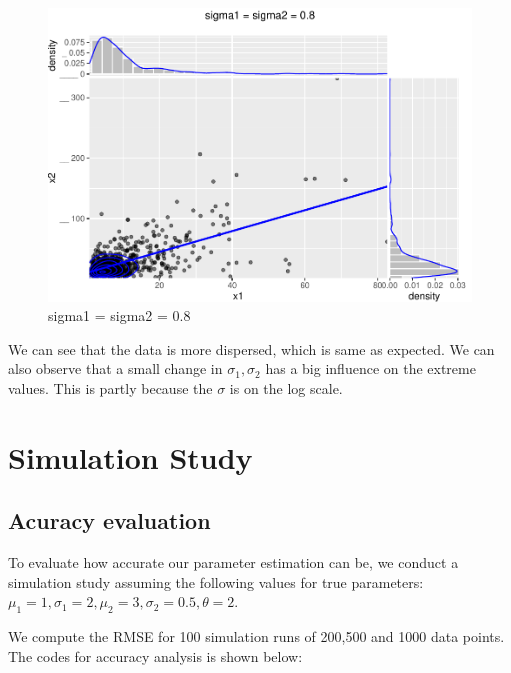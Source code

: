 \documentclass[11pt,]{article}
\begin{document}
\begin{figure}
\centering
\includegraphics{figs/unnamed-chunk-9.pdf}
\caption{sigma1 = sigma2 = 0.8}
\end{figure}

We can see that the data is more dispersed, which is same as expected.
We can also observe that a small change in \(\sigma_1, \sigma_2\) has a
big influence on the extreme values. This is partly because the
\(\sigma\) is on the log scale.

\hypertarget{simulation-study}{%
\section{Simulation Study}\label{simulation-study}}

\hypertarget{acuracy-evaluation}{%
\subsection{Acuracy evaluation}\label{acuracy-evaluation}}

To evaluate how accurate our parameter estimation can be, we conduct a
simulation study assuming the following values for true parameters:
\(\mu_1=1,\sigma_1=2,\mu_2=3,\sigma_2=0.5,\theta=2\).

We compute the RMSE for 100 simulation runs of 200,500 and 1000 data
points. The codes for accuracy analysis is shown below:
\end{document}
